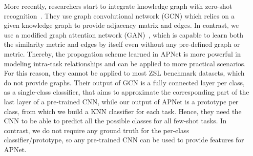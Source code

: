 \documentclass[letterpaper]{article} %
\begin{document}
More recently, researchers start to integrate knowledge graph with zero-shot recognition~\cite{wang2018zero,kampffmeyer2019rethinking}.
They use graph convolutional network (GCN) which relies on a given knowledge graph to provide adjacency matrix and edges. In contrast, we use a modified graph attention network (GAN)~\cite{DBLP:conf/aaai/ShenZLJPZ18,DBLP:conf/naacl/ShenZL0Z19},  which is capable to learn both the similarity metric and edges by itself even without any pre-defined graph or metric. 
Thereby, the propagation scheme learned in APNet is more powerful in modeling intra-task relationships and can be applied to more practical scenarios. For this reason, they cannot be applied to most ZSL benchmark datasets, which do not provide graphs.
Their output of GCN is a fully connected layer per class, as a single-class classifier, that aims to approximate the corresponding part of the last layer of a pre-trained CNN, while our output of APNet is a prototype per class, from which we build a KNN classifier for each task. Hence, they need the CNN to be able to predict all the possible classes for all few-shot tasks. In contrast, we do not require any ground truth for the per-class classifier/prototype, so any pre-trained CNN can be used to provide features for APNet.




\end{document}
